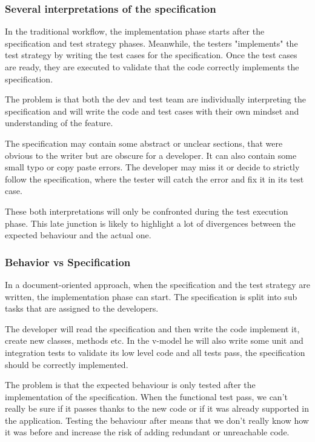 \subsubsection{Several interpretations of the specification}
In the traditional workflow, the implementation phase starts after the
specification and test strategy phases.
Meanwhile, the testers "implements" the test strategy by writing the
test cases for the specification.
Once the test cases are ready, they are executed to validate that the code
correctly implements the specification.

The problem is that both the dev and test team are individually interpreting
the specification and will write the code and test cases with their own
mindset and understanding of the feature.

The specification may contain some abstract or unclear sections, that were
obvious to the writer but are obscure for a developer.
It can also contain some small typo or copy paste errors.
The developer may miss it or decide to strictly follow the specification,
where the tester will catch the error and fix it in its test case.

These both interpretations will only be confronted during the test
execution phase.
This late junction is likely to highlight a lot of divergences between the
expected behaviour and the actual one.

\subsubsection{Behavior vs Specification}
In a document-oriented approach, when the specification and the test strategy
are written, the implementation phase can start.
The specification is split into sub tasks that are assigned to the developers.

The developer will read the specification and then write the code implement
it, create new classes, methods etc.
In the v-model he will also write some unit and integration tests to validate
its low level code and all tests pass, the specification should be correctly
implemented.

The problem is that the expected behaviour is only tested after the
implementation of the specification.
When the functional test pass, we can't really be sure if it passes thanks to
the new code or if it was already supported in the application.
Testing the behaviour after means that we don't really know how it was
before and increase the risk of adding redundant or unreachable code.

